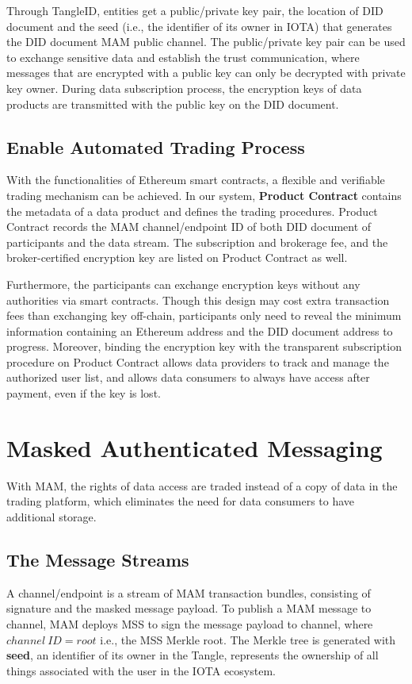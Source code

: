 \documentclass[conference]{IEEEtran}
\begin{document}
Through TangleID, entities get a public/private key pair, the location of DID document and the seed (i.e., the identifier of its owner in IOTA) that generates the DID document MAM public channel. The public/private key pair can be used to exchange sensitive data and establish the trust communication, where messages that are encrypted with a public key can only be decrypted with private key owner. During data subscription process, the encryption keys of data products are transmitted with the public key on the DID document.

\subsection{Enable Automated Trading Process}
With the functionalities of Ethereum smart contracts, a flexible and verifiable trading mechanism can be achieved. In our system, \textbf{Product Contract} contains the metadata of a data product and defines the trading procedures. Product Contract records the MAM channel/endpoint ID of both DID document of participants and the data stream. The subscription and brokerage fee, and the broker-certified encryption key are listed on Product Contract as well. 

Furthermore, the participants can exchange encryption keys without any authorities via smart contracts. Though this design may cost extra transaction fees than exchanging key off-chain, participants only need to reveal the minimum information containing an Ethereum address and the DID document address to progress. Moreover, binding the encryption key with the transparent subscription procedure on Product Contract allows data providers to track and manage the authorized user list, and allows data consumers to always have access after payment, even if the key is lost.  

\section{Masked Authenticated Messaging}
\label{section:MAM}
With MAM, the rights of data access are traded instead of a copy of data in the trading platform, which eliminates the need for data consumers to have additional storage.

\subsection{The Message Streams}
A channel/endpoint is a stream of MAM transaction bundles, consisting of signature and the masked message payload. To publish a MAM message to channel, MAM deploys MSS to sign the message payload to channel, where $channel\ ID = root$ i.e., the MSS Merkle root. The Merkle tree is generated with \textbf{seed}, an identifier of its owner in the Tangle, represents the ownership of all things associated with the user in the IOTA ecosystem.
\end{document}
